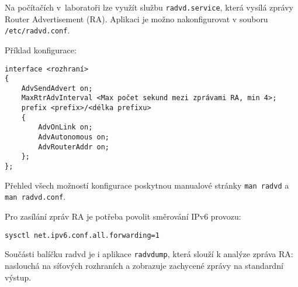 Na počítačích v~laboratoři lze využít službu {\tt radvd.service}, která vysílá zprávy Router Advertisement (RA). Aplikaci je možno nakonfigurovat v souboru {\tt /etc/radvd.conf}.

Příklad konfigurace:
\begin{verbatim}
interface <rozhraní>
{
    AdvSendAdvert on;
    MaxRtrAdvInterval <Max počet sekund mezi zprávami RA, min 4>;
    prefix <prefix>/<délka prefixu>
    {
        AdvOnLink on;
        AdvAutonomous on;
        AdvRouterAddr on;
    };
};
\end{verbatim}
Přehled všech možností konfigurace poskytnou manualové stránky {\tt man radvd} a {\tt man radvd.conf}.

Pro zasílání zpráv RA je potřeba povolit směrování IPv6 provozu:
\begin{verbatim}
sysctl net.ipv6.conf.all.forwarding=1
\end{verbatim}

Součásti balíčku radvd je i aplikace {\tt radvdump}, která slouží k analýze zpráva RA: naslouchá na síťových rozhraních a zobrazuje zachycené zprávy na standardní výstup.
